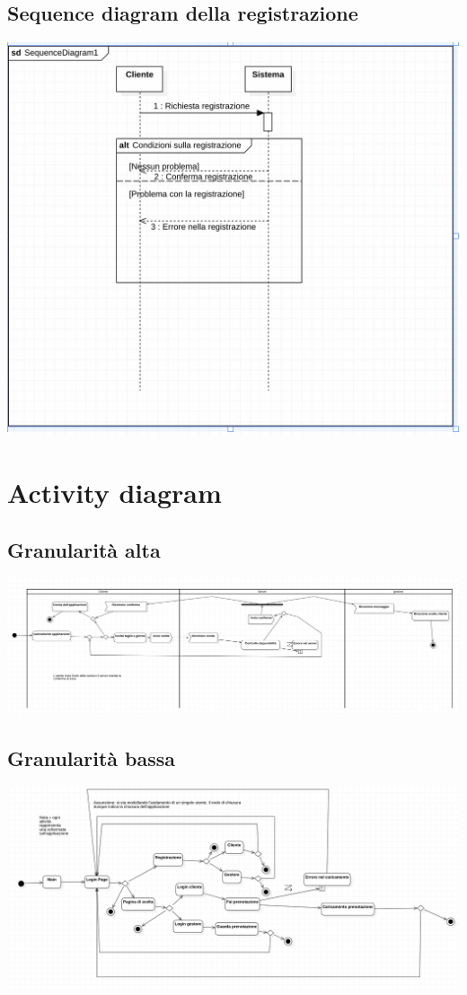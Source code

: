 \documentclass{article}
\begin{document}
\subsection{Sequence diagram della registrazione}
\includegraphics[scale = 0.5]{Immagini/Sequence diagram registrazione.png}

\section{Activity diagram}
\subsection{Granularità alta}
\includegraphics[scale = 0.35]{Immagini/ActivityDiagram1.png}

\subsection{Granularità bassa}
\includegraphics[scale = 0.4]{Immagini/ActivityDiagram2.png}
\end{document}
